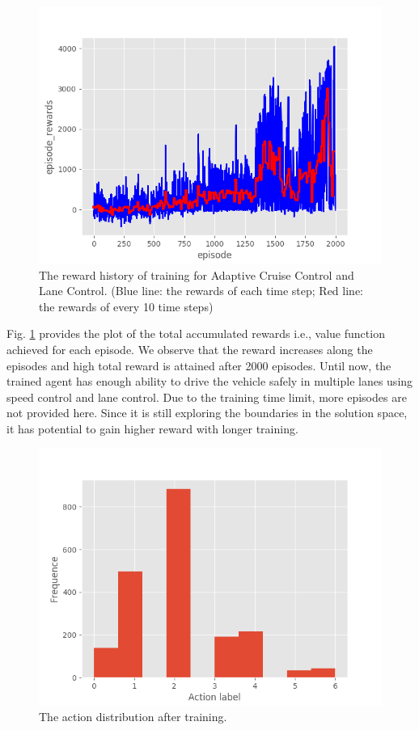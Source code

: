 \begin{figure}[h]
\centering
\includegraphics[width=1.0\textwidth]{figs/ch5/auto-reward}
\caption{The reward history of training for Adaptive Cruise Control and Lane Control. (Blue line: the rewards of each time step; Red line: the rewards of every 10 time steps)}
\label{fig:auto}
\end{figure}

Fig. \ref{fig:auto} provides the plot of the total accumulated rewards i.e., value function achieved for each episode. We observe that the reward increases along the episodes and high total reward is attained after 2000 episodes. Until now, the trained agent has enough ability to drive the vehicle safely in multiple lanes using speed control and lane control. Due to the training time limit, more episodes are not provided here. Since it is still exploring the boundaries in the solution space, it has potential to gain higher reward with longer training.

\begin{figure}[h]
\centering
\includegraphics[width=1.0\textwidth]{figs/ch5/auto_action_distribution}
\caption{The action distribution after training.}
\label{fig:auto-action}
\end{figure}


